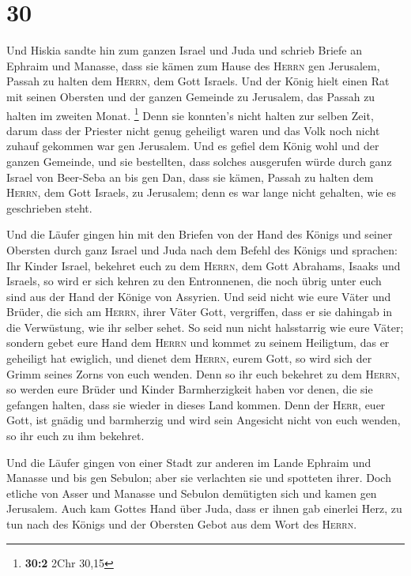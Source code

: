 \hypertarget{section-29}{%
\section{30}\label{section-29}}

 Und Hiskia sandte hin zum ganzen Israel und Juda und
schrieb Briefe an Ephraim und Manasse, dass sie kämen zum Hause des
\textsc{Herrn} gen Jerusalem, Passah zu halten dem \textsc{Herrn}, dem
Gott Israels.  Und der König hielt einen Rat mit seinen
Obersten und der ganzen Gemeinde zu Jerusalem, das Passah zu halten im
zweiten Monat. \footnote{\textbf{30:2} 2Chr 30,15}  Denn
sie konnten's nicht halten zur selben Zeit, darum dass der Priester
nicht genug geheiligt waren und das Volk noch nicht zuhauf gekommen war
gen Jerusalem.  Und es gefiel dem König wohl und der
ganzen Gemeinde,  und sie bestellten, dass solches
ausgerufen würde durch ganz Israel von Beer-Seba an bis gen Dan, dass
sie kämen, Passah zu halten dem \textsc{Herrn}, dem Gott Israels, zu
Jerusalem; denn es war lange nicht gehalten, wie es geschrieben steht.

 Und die Läufer gingen hin mit den Briefen von der Hand
des Königs und seiner Obersten durch ganz Israel und Juda nach dem
Befehl des Königs und sprachen: Ihr Kinder Israel, bekehret euch zu dem
\textsc{Herrn}, dem Gott Abrahams, Isaaks und Israels, so wird er sich
kehren zu den Entronnenen, die noch übrig unter euch sind aus der Hand
der Könige von Assyrien.  Und seid nicht wie eure Väter
und Brüder, die sich am \textsc{Herrn}, ihrer Väter Gott, vergriffen,
dass er sie dahingab in die Verwüstung, wie ihr selber sehet.
 So seid nun nicht halsstarrig wie eure Väter; sondern
gebet eure Hand dem \textsc{Herrn} und kommet zu seinem Heiligtum, das
er geheiligt hat ewiglich, und dienet dem \textsc{Herrn}, eurem Gott, so
wird sich der Grimm seines Zorns von euch wenden.  Denn so
ihr euch bekehret zu dem \textsc{Herrn}, so werden eure Brüder und
Kinder Barmherzigkeit haben vor denen, die sie gefangen halten, dass sie
wieder in dieses Land kommen. Denn der \textsc{Herr}, euer Gott, ist
gnädig und barmherzig und wird sein Angesicht nicht von euch wenden, so
ihr euch zu ihm bekehret.

 Und die Läufer gingen von einer Stadt zur anderen im
Lande Ephraim und Manasse und bis gen Sebulon; aber sie verlachten sie
und spotteten ihrer.  Doch etliche von Asser und Manasse
und Sebulon demütigten sich und kamen gen Jerusalem. 
Auch kam Gottes Hand über Juda, dass er ihnen gab einerlei Herz, zu tun
nach des Königs und der Obersten Gebot aus dem Wort des \textsc{Herrn}.

